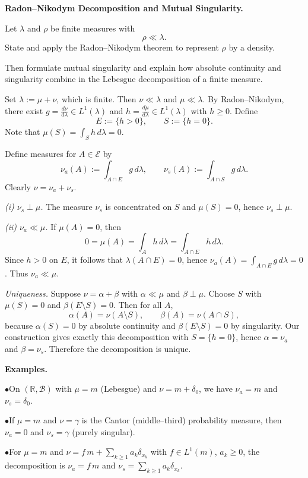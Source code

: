 \begin{problem}[CP-II-0183]
\label{prob:cp-ii-0183}
\textbf{Radon--Nikodym Decomposition and Mutual Singularity.}

\hspace*{1.5em}Let \(\lambda\) and \(\rho\) be finite measures with
\[
\rho\ll\lambda.
\]
State and apply the Radon--Nikodym theorem to represent \(\rho\) by a density.

Then formulate mutual singularity and explain how absolute continuity and
singularity combine in the Lebesgue decomposition of a finite measure.
\end{problem}

\begin{solution}
Set $\lambda:=\mu+\nu$, which is finite. Then $\nu\ll\lambda$ and $\mu\ll\lambda$.
	By Radon--Nikodym, there exist $g=\frac{d\nu}{d\lambda}\in L^1(\lambda)$ and
	$h=\frac{d\mu}{d\lambda}\in L^1(\lambda)$ with $h\ge 0$.
	Define
	\[
	E:=\{h>0\},\qquad S:=\{h=0\}.
	\]
	Note that $\mu(S)=\int_S h\,d\lambda=0$.

	Define measures for $A\in\mathcal E$ by
	\[
	\nu_a(A):=\int_{A\cap E} g\,d\lambda,\qquad
	\nu_s(A):=\int_{A\cap S} g\,d\lambda.
	\]
	Clearly $\nu=\nu_a+\nu_s$.

	\medskip
	\emph{(i) $\nu_s\perp\mu$.}
	The measure $\nu_s$ is concentrated on $S$ and $\mu(S)=0$, hence $\nu_s\perp\mu$.

	\medskip
	\emph{(ii) $\nu_a\ll\mu$.}
	If $\mu(A)=0$, then
	\[
	0=\mu(A)=\int_A h\,d\lambda=\int_{A\cap E} h\,d\lambda.
	\]
	Since $h>0$ on $E$, it follows that $\lambda(A\cap E)=0$, hence
	$\nu_a(A)=\int_{A\cap E} g\,d\lambda=0$. Thus $\nu_a\ll\mu$.

	\medskip
	\emph{Uniqueness.}
	Suppose $\nu=\alpha+\beta$ with $\alpha\ll\mu$ and $\beta\perp\mu$.
	Choose $S$ with $\mu(S)=0$ and $\beta(E\setminus S)=0$.
	Then for all $A$,
	\[
	\alpha(A)=\nu(A\setminus S),\qquad \beta(A)=\nu(A\cap S),
	\]
	because $\alpha(S)=0$ by absolute continuity and $\beta(E\setminus S)=0$ by singularity.
	Our construction gives exactly this decomposition with $S=\{h=0\}$,
	hence $\alpha=\nu_a$ and $\beta=\nu_s$. Therefore the decomposition is unique.

	\bigskip

	\textbf{Examples.}

		\par\smallskip\noindent\(\bullet\)\quad On $(\mathbb{R},\mathcal B)$ with $\mu=m$ (Lebesgue) and $\nu=m+\delta_0$, we have
		$\nu_a=m$ and $\nu_s=\delta_0$.
		\par\smallskip\noindent\(\bullet\)\quad If $\mu=m$ and $\nu=\gamma$ is the Cantor (middle--third) probability measure, then
		$\nu_a=0$ and $\nu_s=\gamma$ (purely singular).
		\par\smallskip\noindent\(\bullet\)\quad For $\mu=m$ and $\nu=f\,m+\sum_{k\ge1} a_k\delta_{x_k}$ with $f\in L^1(m)$, $a_k\ge0$,
		the decomposition is $\nu_a=f\,m$ and $\nu_s=\sum_{k\ge1} a_k\delta_{x_k}$.
\end{solution}

